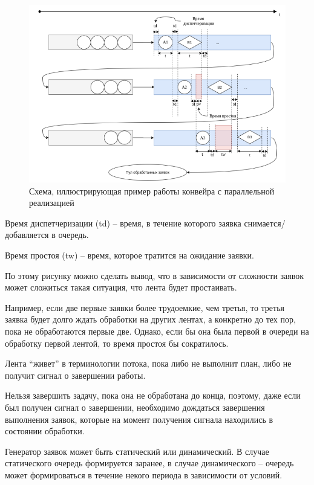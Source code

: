 \begin{figure}[!htb]
	\centering
	\includegraphics[scale=0.5]{imgs/2}
	\caption{Схема, иллюстрирующая пример работы конвейра с
	параллельной реализацией}
	\label{pic:parall-pipeline2}
\end{figure}


Время диспетчеризации (td) -- время, в течение которого заявка снимается/добавляется в очередь.

Время простоя (tw) -- время, которое тратится на ожидание заяв­ки.

По этому рисунку можно сделать вывод, что в зависимости от сложности заявок может 
сложиться такая ситуация, что лента будет про­стаивать.

Например, если две первые заявки более трудоемкие, чем третья, то третья заявка будет
 долго ждать обработки на других лентах, а кон­кретно до тех пор, пока не обработаются 
 первые две. Однако, если бы она была первой в очереди на обработку первой лентой, 
 то время простоя бы сократилось.

Лента ``живет'' в терминологии потока, пока либо не выполнит план, либо не получит 
сигнал о завершении работы.

Нельзя завершить задачу, пока она не обработана до конца, поэто­му, даже если
был получен сигнал о завершении, необходимо дождаться завершения выполнения
заявок, которые на момент получения сигнала находились в состоянии обработки.

Генератор заявок может быть статический или динамический. В случае статического 
очередь формируется заранее, в случае динамического -- очередь может формироваться 
в течение некого периода в зависимости от условий.

